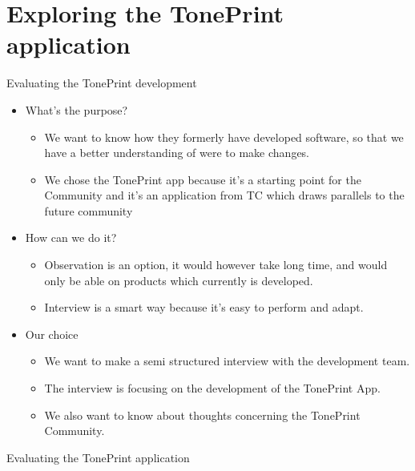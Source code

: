 \chapter{Exploring the TonePrint application}
\label{HeursiticEvaluation}
\begin{LARGE}
Evaluating the TonePrint development
\end{LARGE}

\begin{itemize}
	\item What’s the purpose?
		\begin{itemize}
		\item We want to know how they formerly have developed software, so that we have a better understanding of were to make changes.
		\item We chose the TonePrint app because it’s a starting point for the Community and it’s an application from TC which draws parallels to the future community
		\end{itemize}
	\item How can we do it?
		\begin{itemize}
		\item Observation is an option, it would however take long time, and would only be able on products which currently is developed.
		\item Interview is a smart way because it’s easy to perform and adapt.
		\end{itemize}
	\item Our choice
		\begin{itemize}
		\item We want to make a semi structured interview with the development team.
		\item The interview is focusing on the development of the TonePrint App.
		\item We also want to know about thoughts concerning the TonePrint Community.
		\end{itemize}
\end{itemize}

\begin{LARGE}
Evaluating the TonePrint application
\end{LARGE}

